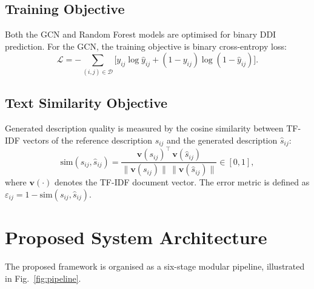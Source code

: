 \documentclass[conference]{IEEEtran}
\begin{document}
\subsection{Training Objective}

Both the GCN and Random Forest models are optimised for binary DDI prediction. For the
GCN, the training objective is binary cross-entropy loss:
\begin{equation}
  \mathcal{L} = -\!\sum_{(i,j)\in\mathcal{D}}
    \!\bigl[y_{ij}\log\hat{y}_{ij} + (1-y_{ij})\log(1-\hat{y}_{ij})\bigr].
  \label{eq:loss}
\end{equation}

\subsection{Text Similarity Objective}

Generated description quality is measured by the cosine similarity between TF-IDF vectors
of the reference description $s_{ij}$ and the generated description $\hat{s}_{ij}$:
\begin{equation}
  \mathrm{sim}(s_{ij}, \hat{s}_{ij}) =
    \frac{\mathbf{v}(s_{ij})^\top\,\mathbf{v}(\hat{s}_{ij})}
         {\|\mathbf{v}(s_{ij})\|\,\|\mathbf{v}(\hat{s}_{ij})\|} \in [0,1],
  \label{eq:cosine}
\end{equation}
where $\mathbf{v}(\cdot)$ denotes the TF-IDF document vector. The error metric is defined
as $\varepsilon_{ij} = 1 - \mathrm{sim}(s_{ij},\hat{s}_{ij})$.

\section{Proposed System Architecture}
\label{sec:arch}

The proposed framework is organised as a six-stage modular pipeline, illustrated in
Fig.~\ref{fig:pipeline}.
\end{document}
